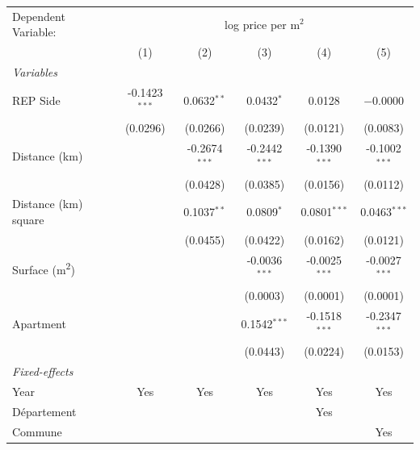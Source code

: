 
\begingroup
\centering
\begin{tabular}{lccccc}
   \toprule \toprule
   Dependent Variable: & \multicolumn{5}{c}{log price per m$^2$}\\
                                      & (1)             & (2)             & (3)             & (4)             & (5)\\
   \midrule
   \emph{Variables}\\
   REP Side                           & -0.1423$^{***}$ & 0.0632$^{**}$   & 0.0432$^{*}$    & 0.0128          & $-$0.0000\\
                                      & (0.0296)        & (0.0266)        & (0.0239)        & (0.0121)        & (0.0083)\\
   Distance (km)                      &                 & -0.2674$^{***}$ & -0.2442$^{***}$ & -0.1390$^{***}$ & -0.1002$^{***}$\\
                                      &                 & (0.0428)        & (0.0385)        & (0.0156)        & (0.0112)\\
   Distance (km) square               &                 & 0.1037$^{**}$   & 0.0809$^{*}$    & 0.0801$^{***}$  & 0.0463$^{***}$\\
                                      &                 & (0.0455)        & (0.0422)        & (0.0162)        & (0.0121)\\
   Surface (m\textsuperscript{2})     &                 &                 & -0.0036$^{***}$ & -0.0025$^{***}$ & -0.0027$^{***}$\\
                                      &                 &                 & (0.0003)        & (0.0001)        & (0.0001)\\
   Apartment                          &                 &                 & 0.1542$^{***}$  & -0.1518$^{***}$ & -0.2347$^{***}$\\
                                      &                 &                 & (0.0443)        & (0.0224)        & (0.0153)\\
   \midrule
   \emph{Fixed-effects}\\
   Year                               & Yes             & Yes             & Yes             & Yes             & Yes\\
   D\'{e}partement                    &                 &                 &                 & Yes             & \\
   Commune                            &                 &                 &                 &                 & Yes\\

\end{tabular}

